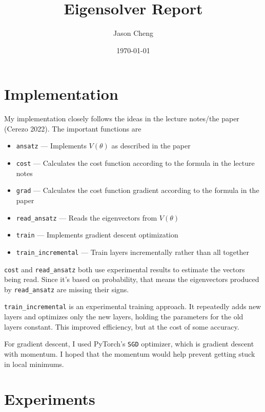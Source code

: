 \documentclass{article}
\title{Eigensolver Report}
\author{Jason Cheng}
\date{\today}
\begin{document}
\maketitle

\section*{Implementation}

My implementation closely follows the ideas in the lecture notes/the paper
(Cerezo 2022). The important functions are
\begin{itemize}
  \item
  \verb|ansatz| --- Implements \( V(\theta) \) as described in the paper

  \item
  \verb|cost| --- Calculates the cost function according to the formula in the
  lecture notes

  \item
  \verb|grad| --- Calculates the cost function gradient according to the formula
  in the paper

  \item
  \verb|read_ansatz| --- Reads the eigenvectors from \( V(\theta) \)

  \item
  \verb|train| --- Implements gradient descent optimization

  \item
  \verb|train_incremental| --- Train layers incrementally rather than all together
\end{itemize}

\verb|cost| and \verb|read_ansatz| both use experimental results to estimate the
vectors being read. Since it's based on probability, that means the eigenvectors
produced by \verb|read_ansatz| are missing their signs.

\verb|train_incremental| is an experimental training approach. It repeatedly
adds new layers and optimizes only the new layers, holding the parameters for
the old layers constant. This improved efficiency, but at the cost of some
accuracy.

For gradient descent, I used PyTorch's \verb|SGD| optimizer, which is gradient
descent with momentum. I hoped that the momentum would help prevent getting
stuck in local minimums.

\section*{Experiments}
\end{document}
